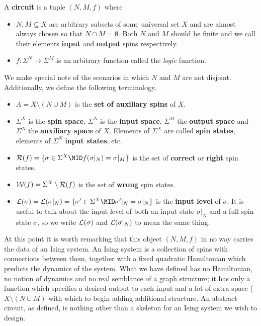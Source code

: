 \documentclass{article}
\begin{document}
\begin{defn}\label{defn:abstract-circuit}
  A \textbf{circuit} is a tuple $(N, M, f)$ where
  \begin{itemize}
    \item $N, M \subseteq X$ are arbitrary subsets of some universal set $X$ and are almost always chosen so that $N \cap M = \emptyset$. Both $N$ and $M$ should be finite and we call their elements \textbf{input} and \textbf{output} spins respectively.
    \item $f: \Sigma^N \to \Sigma^M$ is an arbitrary function called the \emph{logic} function.
  \end{itemize}
  We make special note of the scenarios in which $N$ and $M$ are not disjoint. Additionally, we define the following terminology.
  \begin{itemize}
    \item $A = X \setminus (N\cup M)$ is the \textbf{set of auxiliary spins} of $X$.
    \item $\Sigma^X$ is the \textbf{spin space}, $\Sigma^N$ is the \textbf{input space}, $\Sigma^M$ the \textbf{output space} and $\Sigma^N$ the \textbf{auxiliary space} of $X$. Elements of $\Sigma^X$ are called \textbf{spin states}, elements of $\Sigma^N$ \textbf{input states}, etc.
    \item $\cR(f) = \{\sigma \in \Sigma^X \mid f(\sigma|_N) = \sigma|_M\}$ is the set of \textbf{correct} or \textbf{right} spin states.
    \item $\mathcal{W}(f) = \Sigma^X \setminus \mathcal{R}(f)$ is the set of \textbf{wrong} spin states.
    \item $\cL(\sigma) = \cL(\sigma|_N) = \{\sigma' \in \Sigma^X \mid \sigma'|_N = \sigma|_N\}$ is the \textbf{input level} of $\sigma$. It is useful to talk about the input level of both an input state $\sigma|_N$ and a full spin state $\sigma$, so we write $\mathcal{L}(\sigma)$ and $\mathcal{L}(\sigma|_N)$ to mean the same thing.
  \end{itemize}
\end{defn}

At this point it is worth remarking that this object $(N,M,f)$ in no way carries the data of an Ising system. An Ising system is a collection of spins with connections between them, together with a fixed quadratic Hamiltonian which predicts the dynamics of the system. What we have defined has no Hamiltonian, no notion of dynamics and no real semblance of a graph structure; it has only a function which specifies a desired output to each input and a lot of extra space ($X\setminus (N\cup M)$ with which to begin adding additional structure. An abstract circuit, as defined, is nothing other than a skeleton for an Ising system we wish to design. 
\end{document}
